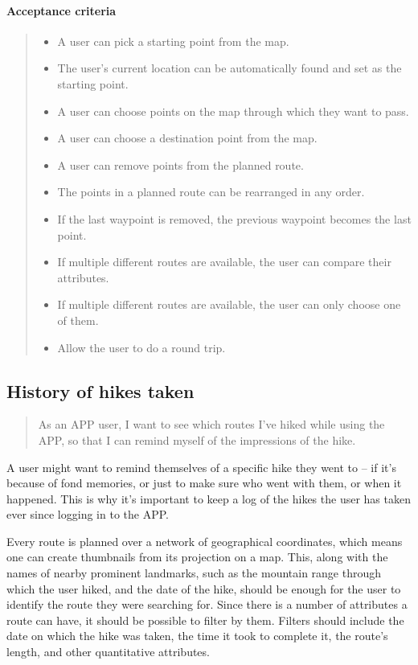 \paragraph*{Acceptance criteria}
\begin{quote}
\begin{itemize}
    \item A user can pick a starting point from the map.
    \item The user's current location can be automatically found and set as the starting point.
    \item A user can choose points on the map through which they want to pass.
    \item A user can choose a destination point from the map.
    \item A user can remove points from the planned route.
    \item The points in a planned route can be rearranged in any order.
    \item If the last waypoint is removed, the previous waypoint becomes the last point.
    \item If multiple different routes are available, the user can compare their attributes.
    \item If multiple different routes are available, the user can only choose one of them.
    \item Allow the user to do a round trip.
\end{itemize}
\end{quote}

\subsection{History of hikes taken}\label{US:map-history}
\begin{quote}
As an APP user, I want to see which routes I've hiked while using the APP, so that I can remind myself of the impressions of the hike.
\end{quote}

A user might want to remind themselves of a specific hike they went to -- if it's because of fond memories, or just to make sure who went with them, or when it happened.
This is why it's important to keep a log of the hikes the user has taken ever since logging in to the APP.

Every route is planned over a network of geographical coordinates, which means one can create thumbnails from its projection on a map.
This, along with the names of nearby prominent landmarks, such as the mountain range through which the user hiked, and the date of the hike, should be enough for the user to identify the route they were searching for.
Since there is a number of attributes a route can have, it should be possible to filter by them.
Filters should include the date on which the hike was taken, the time it took to complete it, the route's length, and other quantitative attributes.

